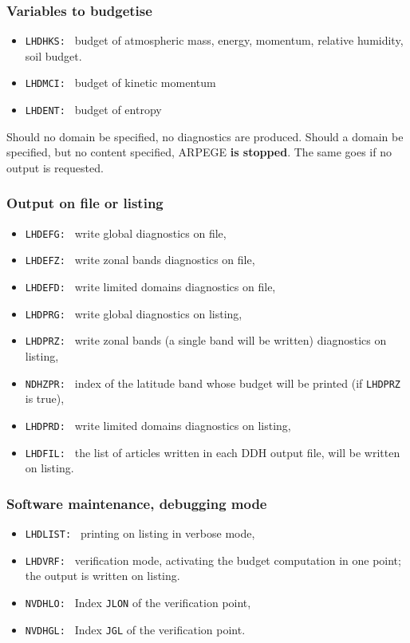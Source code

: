 \subsubsection{Variables to budgetise}
\begin{itemize}
\item {\tt LHDHKS: } budget of atmospheric mass, energy, momentum, relative humidity, soil  budget.
\item {\tt LHDMCI: } budget of kinetic momentum
\item {\tt LHDENT: } budget of entropy
\end{itemize}
\ms
Should no domain be specified, no diagnostics are produced.
Should a domain be specified, but no content specified, ARPEGE {\bf is stopped}. The same goes if no output is requested.
\subsubsection{Output on file or listing}
\begin{itemize}
\item {\tt LHDEFG: } write global diagnostics on file,
\item {\tt LHDEFZ: } write zonal bands diagnostics on file,
\item{\tt LHDEFD: } write limited domains diagnostics on file,
\item {\tt LHDPRG: } write global diagnostics on listing,
\item {\tt LHDPRZ: } write zonal bands (a single band will be written) diagnostics on listing,
\item {\tt NDHZPR: } index of the latitude band whose budget will be printed (if {\tt LHDPRZ} is true),
\item {\tt LHDPRD: } write limited domains diagnostics on listing,
\item {\tt LHDFIL: } the list of articles written in each DDH output file, will be written on listing.
\end{itemize}
\subsubsection{Software maintenance, debugging mode}
\begin{itemize}
\item {\tt LHDLIST: } printing on listing in verbose mode,
\item {\tt LHDVRF: } verification mode, activating the budget computation in one point; the output is written on listing.
\item {\tt NVDHLO: } Index {\tt JLON} of the verification point,
\item {\tt NVDHGL: } Index {\tt JGL} of the verification point.
\end{itemize}

